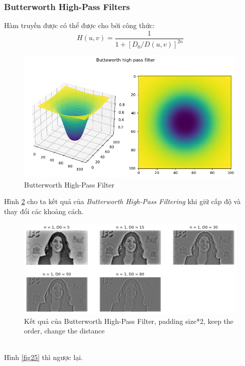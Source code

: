 \documentclass{article}
\begin{document}
        \subsubsection{Butterworth High-Pass Filters}
        Hàm truyền được có thể được cho bởi công thức:
        $$H(u,v) = \frac{1}{1+\left[D_0/D(u,v)\right]^{2n}}$$
        \begin{figure}[ht!]
        \centering
        \includegraphics[width = \linewidth]{fo22.png}
        \caption{Butterworth High-Pass Filter}
        \label{fig23}
        \end{figure}
        Hình \ref{fig24} cho ta kết quả của \textit{Butterworth High-Pass Filtering} khi giữ cấp độ và thay đổi các khoảng cách.
        \begin{figure}[ht!]
        \centering
        \includegraphics[width = \linewidth]{fo23a.png}
        \caption{Kết quả của Butterworth High-Pass Filter, padding size*2, keep the order, change the distance}
        \label{fig24}
        \end{figure}
        \phantom{a}\\
        Hình \ref{fig25} thì ngược lại.
\end{document}
